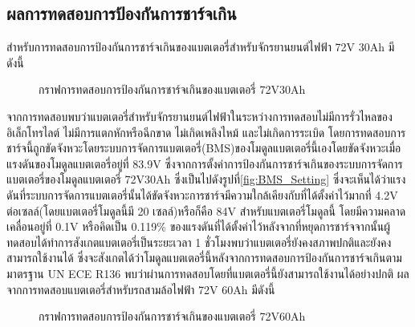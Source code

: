 \subsection{ผลการทดสอบการป้องกันการชาร์จเกิน}
สำหรับการทดสอบการป้องกันการชาร์จเกินของแบตเตอรี่สำหรับจักรยานยนต์ไฟฟ้า 72V 30Ah มีดังนี้
\begin{center}
	\begin{figure}[H]
		\centering
		\captionsetup{justification=centering,margin=2cm}
		\caption{กราฟการทดสอบการป้องกันการชาร์จเกินของแบตเตอรี่ 72V30Ah}
	\end{figure}
\end{center}
จากการทดสอบพบว่าแบตเตอรี่สำหรับจักรยานยนต์ไฟฟ้าในระหว่างการทดสอบไม่มีการรั่วไหลของ\\อิเล็กโทรไลต์ ไม่มีการแตกหักหรือฉีกขาด ไม่เกิดเพลิงไหม้ และไม่เกิดการระเบิด
โดยการทดสอบการชาร์จนี้ถูกขัดจังหวะโดยระบบการจัดการแบตเตอรี่(BMS)ของโมดูลแบตเตอรี่นี้เองโดยขัดจังหวะเมื่อแรงดันของโมดูลแบตเตอรี่อยู่ที่ 83.9V
ซึ่งจากการตั้งค่าการป้องกันการชาร์จเกินของระบบการจัดการแบตเตอรี่ของโมดูลแบตเตอรี่ 72V30Ah ซึ่งเป็นไปดังรูปที่\ref{fig:BMS_Setting}
ซึ่งจะเห็นได้ว่าแรงดันที่ระบบการจัดการแบตเตอรี่นั้นได้ขัดจังหวะการชาร์จมีความใกล้เคียงกับที่ได้ตั้งค่าไว้มากที่ 4.2V ต่อเซลล์(โดยแบตเตอรี่โมดูลนี้มี 20 เซลล์)หรือก็คือ 84V สำหรับแบตเตอรี่โมดูลนี้
โดยมีความคลาดเคลื่อนอยู่ที่ 0.1V หรือคิดเป็น 0.119\% ของแรงดันที่ได้ตั้งค่าไว้หลังจากที่หยุดการชาร์จจากนั้นผู้ทดสอบได้ทำการสังเกตแบตเตอรี่เป็นระยะเวลา 1 
ชั่วโมงพบว่าแบตเตอรี่ยังคงสภาพปกติและยังคงสามารถใช้งานได้
ซึ่งจะสังเกตได้ว่าโมดูลแบตเตอรี่นี้หลังจากการทดสอบการป้องกันการชาร์จเกินตามมาตรฐาน UN ECE R136 พบว่าผ่านการทดสอบโดยที่แบตเตอรี่นี้ยังสามารถใช้งานได้อย่างปกติ
\newpage
ผลจากการทดสอบแบตเตอรี่สำหรับรถสามล้อไฟฟ้า 72V 60Ah มีดังนี้
\begin{center}
	\begin{figure}[H]
		\centering
		\captionsetup{justification=centering,margin=2cm}
		\caption{กราฟการทดสอบการป้องกันการชาร์จเกินของแบตเตอรี่ 72V60Ah}
	\end{figure}
\end{center}
